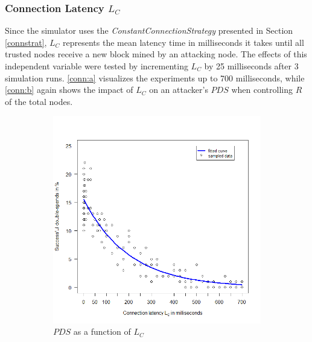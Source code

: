 \documentclass[a4paper,12pt,twoside]{report}
\begin{document}
\subsubsection{Connection Latency $L_C$}
Since the simulator uses the \textit{ConstantConnectionStrategy} presented in Section \ref{connstrat}, $L_C$ represents the mean latency time in milliseconds it takes until all trusted nodes receive a new block mined by an attacking node. The effects of this independent variable were tested by incrementing $L_C$ by 25 milliseconds after 3 simulation runs. \autoref{conn:a} visualizes the experiments up to 700 milliseconds, while \autoref{conn:b} again shows the impact of $L_C$ on an attacker's $PDS$ when controlling $R$ of the total nodes.\begin{figure}
\centering
\begin{subfigure}{.5\textwidth}
  \centering
  \includegraphics[width=\linewidth]{Experiments/ConnLatency/connection.png}
  \caption{$PDS$ as a function of $L_{C}$}
  \label{conn:a}
\end{subfigure}%
\begin{subfigure}{.5\textwidth}
  \centering

\end{subfigure}
\end{figure}
\end{document}
